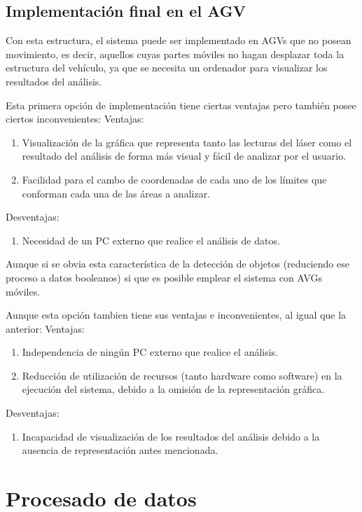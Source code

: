 \subsection{Implementación final en el AGV}
Con esta estructura, el sistema puede ser implementado en AGVs que no posean movimiento, es decir, aquellos cuyas partes móviles no hagan desplazar toda la estructura del vehículo, ya que se necesita un ordenador para visualizar los resultados del análisis.


Esta primera opción de implementación tiene ciertas ventajas pero también posee ciertos inconvenientes:
Ventajas:
\begin{enumerate}
	\item Visualización de la gráfica que representa tanto las lecturas del láser como el resultado del análisis de forma más visual y fácil de analizar por el usuario.
	\item Facilidad para el cambo de coordenadas de cada uno de los límites que conforman cada una de las áreas a analizar.
\end{enumerate}
Desventajas:
\begin{enumerate}
	\item Necesidad de un PC externo que realice el análisis de datos.
\end{enumerate}

Aunque si se obvia esta característica de la detección de objetos (reduciendo ese proceso a datos booleanos) si que es posible emplear el sistema con AVGs móviles.

Aunque esta opción tambien tiene sus ventajas e inconvenientes, al igual que la anterior:
Ventajas:
\begin{enumerate}
	\item Independencia de ningún PC externo que realice el análisis.
	\item Reducción de utilización de recursos (tanto hardware como software) en la ejecución del sistema, debido a la omisión de la representación gráfica.
\end{enumerate}
Desventajas:
\begin{enumerate}
	\item Incapacidad de visualización de los resultados del análisis debido a la ausencia de representación antes mencionada.
\end{enumerate}

\section{Procesado de datos}

